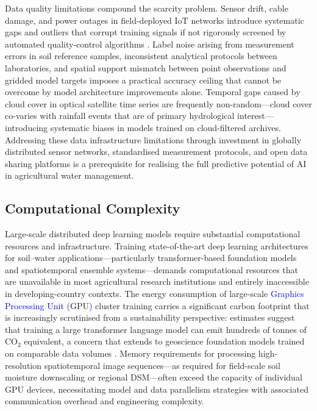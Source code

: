 \documentclass[land,article,submit,pdftex,moreauthors]{Definitions/mdpi}
\numberwithin{equation}{section}
\begin{document}
Data quality limitations compound the scarcity problem. Sensor drift, cable damage, and power outages in field-deployed IoT networks introduce systematic gaps and outliers that corrupt training signals if not rigorously screened by automated quality-control algorithms \citep{gruber2020}. Label noise arising from measurement errors in soil reference samples, inconsistent analytical protocols between laboratories, and spatial support mismatch between point observations and gridded model targets imposes a practical accuracy ceiling that cannot be overcome by model architecture improvements alone. Temporal gaps caused by cloud cover in optical satellite time series are frequently non-random---cloud cover co-varies with rainfall events that are of primary hydrological interest---introducing systematic biases in models trained on cloud-filtered archives. Addressing these data infrastructure limitations through investment in globally distributed sensor networks, standardised measurement protocols, and open data sharing platforms is a prerequisite for realising the full predictive potential of AI in agricultural water management.

\subsection{Computational Complexity}

Large-scale distributed deep learning models require substantial computational resources and infrastructure. Training state-of-the-art deep learning architectures for soil--water applications---particularly transformer-based foundation models and spatiotemporal ensemble systems---demands computational resources that are unavailable in most agricultural research institutions and entirely inaccessible in developing-country contexts. The energy consumption of large-scale \textcolor{blue}{Graphics Processing Unit (}GPU\textcolor{blue}{)} cluster training carries a significant carbon footprint that is increasingly scrutinised from a sustainability perspective: estimates suggest that training a large transformer language model can emit hundreds of tonnes of CO$_2$ equivalent, a concern that extends to geoscience foundation models trained on comparable data volumes \citep{schwartz2020green}. Memory requirements for processing high-resolution spatiotemporal image sequences---as required for field-scale soil moisture downscaling or regional DSM---often exceed the capacity of individual GPU devices, necessitating model and data parallelism strategies with associated communication overhead and engineering complexity.
\end{document}
